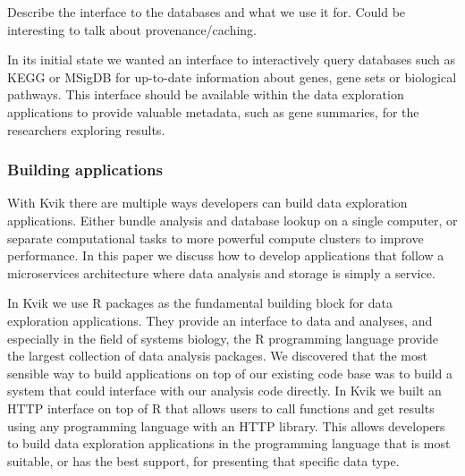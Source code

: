 Describe the interface to the databases and what we use it for. Could be
interesting to talk about provenance/caching.



In its initial state we wanted an interface to interactively query databases
such as KEGG or MSigDB for up-to-date information about genes, gene sets or
biological pathways. This interface should be available within the data
exploration applications to provide valuable metadata, such as gene summaries,
for the researchers exploring results.  




\subsubsection*{Building applications} 

With Kvik there are multiple ways developers can build data
exploration applications. Either bundle analysis and database lookup on a single
computer, or separate computational tasks to more powerful compute clusters to
improve performance. 
In this paper we discuss how to develop applications that follow a
microservices architecture where data analysis and storage is simply a service. 

In Kvik we use R packages as the fundamental building block for data exploration
applications. They provide an interface to data and analyses, and especially in
the field of systems biology, the R programming language provide the largest
collection of data analysis packages. %
We discovered that the most sensible way to build applications on top of our
existing code base was to build a system that could interface with our analysis
code directly. In Kvik we built an HTTP interface on top of R that allows users
to call functions and get results using any programming language with an HTTP
library. This allows developers to build data exploration applications in the
programming language that is most suitable, or has the best support, for
presenting that specific data type. 




